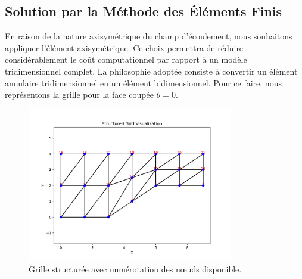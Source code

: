 \documentclass[12pt]{book}
\theoremstyle{bfnote}
\theoremstyle{bfnote}
\begin{document}
\subsection{Solution par la Méthode des Éléments Finis} %
\label{subsec:Solution_par_la_Méthode_des_Éléments_Finis}

En raison de la nature axisymétrique du champ d'écoulement, nous souhaitons appliquer l'élément axisymétrique. Ce choix permettra de réduire considérablement le coût computationnel par rapport à un modèle tridimensionnel complet. La philosophie adoptée consiste à convertir un élément annulaire tridimensionnel en un élément bidimensionnel. Pour ce faire, nous représentons la grille pour la face coupée $\theta = 0$.

\begin{figure}[h!]
    \centering
    \includegraphics[width=0.8\textwidth, height=0.6\textheight, keepaspectratio]{triangular_grid.pdf}
    \caption{Grille structurée avec numérotation des nœuds disponible.}
    \label{fig:structured_grid}
\end{figure}
\end{document}
